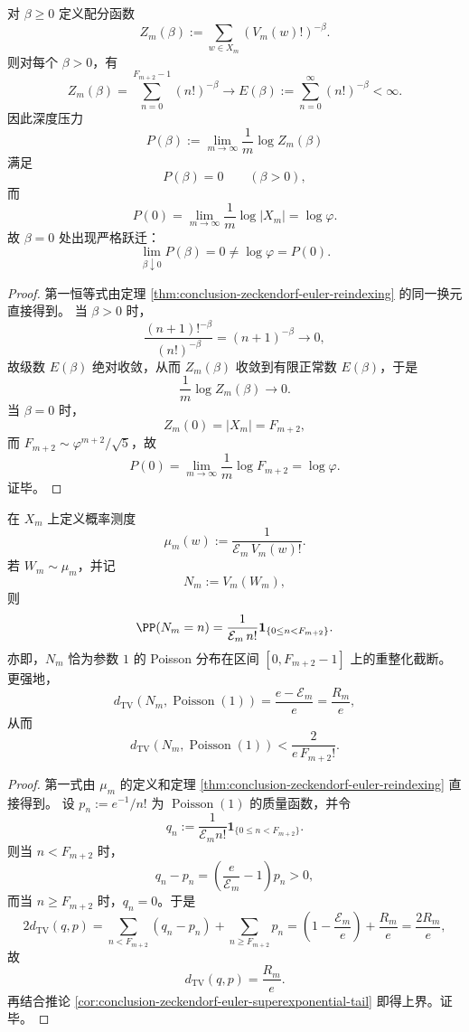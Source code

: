 \begin{theorem}\label{thm:conclusion-factorial-potential-positive-temperature-pressure-collapse}
对 \(\beta\ge 0\) 定义配分函数
\[
Z_m(\beta):=\sum_{w\in X_m}(V_m(w)!)^{-\beta}.
\]
则对每个 \(\beta>0\)，有
\[
Z_m(\beta)=\sum_{n=0}^{F_{m+2}-1}(n!)^{-\beta}
\longrightarrow
E(\beta):=\sum_{n=0}^{\infty}(n!)^{-\beta}<\infty.
\]
因此深度压力
\[
P(\beta):=\lim_{m\to\infty}\frac{1}{m}\log Z_m(\beta)
\]
满足
\[
P(\beta)=0\qquad(\beta>0),
\]
而
\[
P(0)=\lim_{m\to\infty}\frac{1}{m}\log|X_m|=\log\varphi.
\]
故 \(\beta=0\) 处出现严格跃迁：
\[
\lim_{\beta\downarrow 0}P(\beta)=0\neq \log\varphi=P(0).
\]
\end{theorem}
\begin{proof}
第一恒等式由定理 \ref{thm:conclusion-zeckendorf-euler-reindexing} 的同一换元直接得到。
当 \(\beta>0\) 时，
\[
\frac{(n+1)!^{-\beta}}{(n!)^{-\beta}}=(n+1)^{-\beta}\to 0,
\]
故级数 \(E(\beta)\) 绝对收敛，从而 \(Z_m(\beta)\) 收敛到有限正常数 \(E(\beta)\)，于是
\[
\frac{1}{m}\log Z_m(\beta)\to 0.
\]
当 \(\beta=0\) 时，
\[
Z_m(0)=|X_m|=F_{m+2},
\]
而 \(F_{m+2}\sim \varphi^{m+2}/\sqrt5\)，故
\[
P(0)=\lim_{m\to\infty}\frac{1}{m}\log F_{m+2}=\log\varphi.
\]
证毕。
\end{proof}

\begin{theorem}\label{thm:conclusion-zeckendorf-euler-poisson-boundary}
在 \(X_m\) 上定义概率测度
\[
\mu_m(w):=\frac{1}{\mathcal E_m\,V_m(w)!}.
\]
若 \(W_m\sim \mu_m\)，并记
\[
N_m:=V_m(W_m),
\]
则
\[
\PP(N_m=n)=\frac{1}{\mathcal E_m\,n!}\mathbf 1_{\{0\le n<F_{m+2}\}}.
\]
亦即，\(N_m\) 恰为参数 \(1\) 的 Poisson 分布在区间 \([0,F_{m+2}-1]\) 上的重整化截断。更强地，
\[
d_{\mathrm{TV}}\!\left(N_m,\operatorname{Poisson}(1)\right)=\frac{e-\mathcal E_m}{e}=\frac{R_m}{e},
\]
从而
\[
d_{\mathrm{TV}}\!\left(N_m,\operatorname{Poisson}(1)\right)<\frac{2}{e\,F_{m+2}!}.
\]
\end{theorem}
\begin{proof}
第一式由 \(\mu_m\) 的定义和定理 \ref{thm:conclusion-zeckendorf-euler-reindexing} 直接得到。
设 \(p_n:=e^{-1}/n!\) 为 \(\operatorname{Poisson}(1)\) 的质量函数，并令
\[
q_n:=\frac{1}{\mathcal E_m n!}\mathbf 1_{\{0\le n<F_{m+2}\}}.
\]
则当 \(n<F_{m+2}\) 时，
\[
q_n-p_n=\left(\frac{e}{\mathcal E_m}-1\right)p_n>0,
\]
而当 \(n\ge F_{m+2}\) 时，\(q_n=0\)。于是
\[
2d_{\mathrm{TV}}(q,p)
=
\sum_{n<F_{m+2}}(q_n-p_n)+\sum_{n\ge F_{m+2}}p_n
=
\left(1-\frac{\mathcal E_m}{e}\right)+\frac{R_m}{e}
=
\frac{2R_m}{e},
\]
故
\[
d_{\mathrm{TV}}(q,p)=\frac{R_m}{e}.
\]
再结合推论 \ref{cor:conclusion-zeckendorf-euler-superexponential-tail} 即得上界。证毕。
\end{proof}

